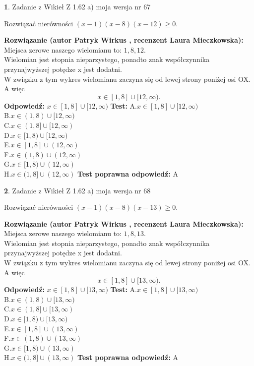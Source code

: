 \documentclass[12pt, a4paper]{article}
\theoremstyle{definition} %
\newtheorem{zad}{}
\newcommand{\zadStart}[1]{\begin{zad}#1\newline}
\newcommand{\zadStop}{\end{zad}}
\newcommand{\rozwStart}[2]{\noindent \textbf{Rozwiązanie (autor #1 , recenzent #2): }\newline}
\newcommand{\rozwStop}{\newline}
\newcommand{\odpStart}{\noindent \textbf{Odpowiedź:}\newline}
\newcommand{\odpStop}{\newline}
\newcommand{\testStart}{\noindent \textbf{Test:}\newline}
\newcommand{\testStop}{\newline}
\newcommand{\kluczStart}{\noindent \textbf{Test poprawna odpowiedź:}\newline}
\newcommand{\kluczStop}{\newline}
\begin{document}
\zadStart{Zadanie z Wikieł Z 1.62 a) moja wersja nr 67}

Rozwiązać nierówności $(x-1)(x-8)(x-12)\ge0$.
\zadStop
\rozwStart{Patryk Wirkus}{Laura Mieczkowska}
Miejsca zerowe naszego wielomianu to: $1, 8, 12$.\\
Wielomian jest stopnia nieparzystego, ponadto znak współczynnika przy\linebreak najwyższej potędze x jest dodatni.\\ W związku z tym wykres wielomianu zaczyna się od lewej strony poniżej osi OX. A więc $$x \in [1,8] \cup [12,\infty).$$
\rozwStop
\odpStart
$x \in [1,8] \cup [12,\infty)$
\odpStop
\testStart
A.$x \in [1,8] \cup [12,\infty)$\\
B.$x \in (1,8) \cup [12,\infty)$\\
C.$x \in (1,8] \cup [12,\infty)$\\
D.$x \in [1,8) \cup [12,\infty)$\\
E.$x \in [1,8] \cup (12,\infty)$\\
F.$x \in (1,8) \cup (12,\infty)$\\
G.$x \in [1,8) \cup (12,\infty)$\\
H.$x \in (1,8] \cup (12,\infty)$
\testStop
\kluczStart
A
\kluczStop



\zadStart{Zadanie z Wikieł Z 1.62 a) moja wersja nr 68}

Rozwiązać nierówności $(x-1)(x-8)(x-13)\ge0$.
\zadStop
\rozwStart{Patryk Wirkus}{Laura Mieczkowska}
Miejsca zerowe naszego wielomianu to: $1, 8, 13$.\\
Wielomian jest stopnia nieparzystego, ponadto znak współczynnika przy\linebreak najwyższej potędze x jest dodatni.\\ W związku z tym wykres wielomianu zaczyna się od lewej strony poniżej osi OX. A więc $$x \in [1,8] \cup [13,\infty).$$
\rozwStop
\odpStart
$x \in [1,8] \cup [13,\infty)$
\odpStop
\testStart
A.$x \in [1,8] \cup [13,\infty)$\\
B.$x \in (1,8) \cup [13,\infty)$\\
C.$x \in (1,8] \cup [13,\infty)$\\
D.$x \in [1,8) \cup [13,\infty)$\\
E.$x \in [1,8] \cup (13,\infty)$\\
F.$x \in (1,8) \cup (13,\infty)$\\
G.$x \in [1,8) \cup (13,\infty)$\\
H.$x \in (1,8] \cup (13,\infty)$
\testStop
\kluczStart
A
\kluczStop
\end{document}
